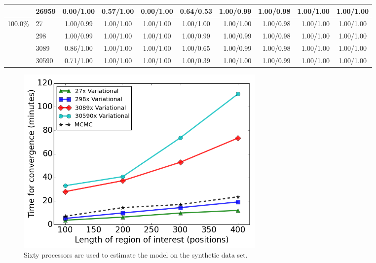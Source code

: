 \documentclass{bmcart}
\begin{document}
\begin{backmatter}
\begin{table}[htbp]
\begin{tabular}{rrrrrrrrrr}
    \multicolumn{1}{c}{} & \multicolumn{1}{l}{26959} & \multicolumn{1}{c}{0.00/1.00} & \multicolumn{1}{c}{0.57/1.00} & \multicolumn{1}{c}{0.00/1.00} & \multicolumn{1}{c}{0.64/0.53} & 1.00/0.99 & 1.00/0.98 & 1.00/1.00 & \multicolumn{1}{c}{1.00/1.00} \\
    \midrule
    \multicolumn{1}{c}{100.0\%} & \multicolumn{1}{l}{27} & \multicolumn{1}{c}{1.00/0.99} & \multicolumn{1}{c}{1.00/1.00} & \multicolumn{1}{c}{1.00/1.00} & \multicolumn{1}{c}{1.00/1.00} & 1.00/1.00 & 1.00/0.98 & 1.00/1.00 & \multicolumn{1}{c}{1.00/1.00} \\
    \multicolumn{1}{c}{} & \multicolumn{1}{l}{298} & \multicolumn{1}{c}{1.00/0.99} & \multicolumn{1}{c}{1.00/1.00} & \multicolumn{1}{c}{1.00/1.00} & \multicolumn{1}{c}{1.00/0.99} & 1.00/0.99 & 1.00/0.98 & 1.00/1.00 & \multicolumn{1}{c}{1.00/1.00} \\
    \multicolumn{1}{c}{} & \multicolumn{1}{l}{3089} & \multicolumn{1}{c}{0.86/1.00} & \multicolumn{1}{c}{1.00/1.00} & \multicolumn{1}{c}{1.00/1.00} & \multicolumn{1}{c}{1.00/0.65} & 1.00/0.99 & 1.00/0.98 & 1.00/1.00 & \multicolumn{1}{c}{1.00/1.00} \\
    \multicolumn{1}{c}{} & \multicolumn{1}{l}{30590} & \multicolumn{1}{c}{0.71/1.00} & \multicolumn{1}{c}{1.00/1.00} & \multicolumn{1}{c}{1.00/1.00} & \multicolumn{1}{c}{1.00/0.39} & 1.00/1.00 & 1.00/0.99 & 1.00/1.00 & \multicolumn{1}{c}{1.00/1.00} \\
    \bottomrule
    \end{tabular}%
\end{table}%


\clearpage
\begin{figure}[ht]
\centering
\includegraphics[width=0.6\textwidth]{timing.png}
\caption{
Sixty processors are used to estimate the model on the synthetic data set.}%
\end{figure}


\end{backmatter}
\end{document}
